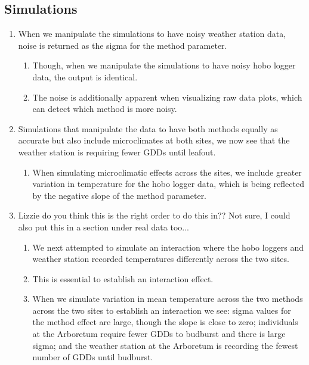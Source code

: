 \documentclass{article}\usepackage[]{graphicx}\usepackage[]{color}
\begin{document}
\subsection*{Simulations}
\begin{enumerate}
\item When we manipulate the simulations to have noisy weather station data, noise is returned as the sigma for the method parameter. 
  \begin{enumerate}
  \item Though, when we manipulate the simulations to have noisy hobo logger data, the output is identical.
  \item The noise is additionally apparent when visualizing raw data plots, which can detect which method is more noisy.
  \end{enumerate}
  
\item Simulations that manipulate the data to have both methods equally as accurate but also include microclimates at both sites, we now see that the weather station is requiring fewer GDDs until leafout. 
  \begin{enumerate}
  \item When simulating microclimatic effects across the sites, we include greater variation in temperature for the hobo logger data, which is being reflected by the negative slope of the method parameter. 
  \end{enumerate}
  
\item Lizzie do you think this is the right order to do this in?? Not sure, I could also put this in a section under real data too...
  \begin{enumerate}
  \item We next attempted to simulate an interaction where the hobo loggers and weather station recorded temperatures differently across the two sites. %
  \item This is essential to establish an interaction effect. 
  \item When we simulate variation in mean temperature across the two methods across the two sites to establish an interaction we see: sigma values for the method effect are large, though the slope is close to zero; individuals at the Arboretum require fewer GDDs to budburst and there is large sigma; and the weather station at the Arboretum is recording the fewest number of GDDs until budburst.
  \end{enumerate}
\end{enumerate}
\end{document}
